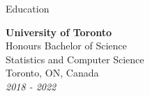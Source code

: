 \documentclass{resume} %
\begin{document}
\begin{rSection}{Education}

{\bf University of Toronto}
\\ Honours Bachelor of Science
\\ Statistics and Computer Science
\\ Toronto, ON, Canada
\\ \textit{2018 - 2022}
\end{rSection}
\end{document}
